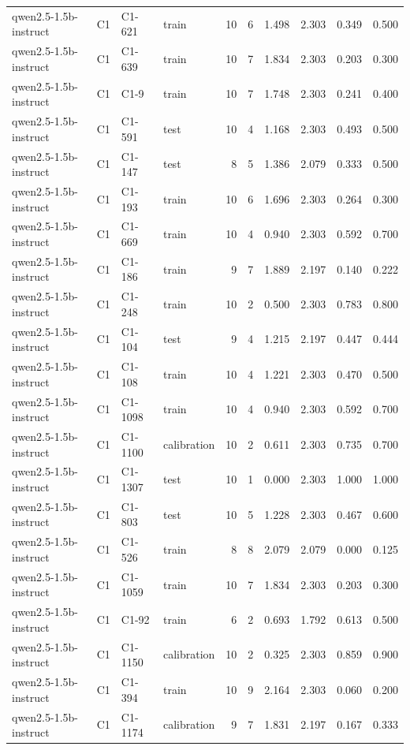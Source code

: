 \begin{table}
\begin{tabular}{llllrrrrrr}
qwen2.5-1.5b-instruct & C1 & C1-621 & train & 10 & 6 & 1.498 & 2.303 & 0.349 & 0.500 \\
qwen2.5-1.5b-instruct & C1 & C1-639 & train & 10 & 7 & 1.834 & 2.303 & 0.203 & 0.300 \\
qwen2.5-1.5b-instruct & C1 & C1-9 & train & 10 & 7 & 1.748 & 2.303 & 0.241 & 0.400 \\
qwen2.5-1.5b-instruct & C1 & C1-591 & test & 10 & 4 & 1.168 & 2.303 & 0.493 & 0.500 \\
qwen2.5-1.5b-instruct & C1 & C1-147 & test & 8 & 5 & 1.386 & 2.079 & 0.333 & 0.500 \\
qwen2.5-1.5b-instruct & C1 & C1-193 & train & 10 & 6 & 1.696 & 2.303 & 0.264 & 0.300 \\
qwen2.5-1.5b-instruct & C1 & C1-669 & train & 10 & 4 & 0.940 & 2.303 & 0.592 & 0.700 \\
qwen2.5-1.5b-instruct & C1 & C1-186 & train & 9 & 7 & 1.889 & 2.197 & 0.140 & 0.222 \\
qwen2.5-1.5b-instruct & C1 & C1-248 & train & 10 & 2 & 0.500 & 2.303 & 0.783 & 0.800 \\
qwen2.5-1.5b-instruct & C1 & C1-104 & test & 9 & 4 & 1.215 & 2.197 & 0.447 & 0.444 \\
qwen2.5-1.5b-instruct & C1 & C1-108 & train & 10 & 4 & 1.221 & 2.303 & 0.470 & 0.500 \\
qwen2.5-1.5b-instruct & C1 & C1-1098 & train & 10 & 4 & 0.940 & 2.303 & 0.592 & 0.700 \\
qwen2.5-1.5b-instruct & C1 & C1-1100 & calibration & 10 & 2 & 0.611 & 2.303 & 0.735 & 0.700 \\
qwen2.5-1.5b-instruct & C1 & C1-1307 & test & 10 & 1 & 0.000 & 2.303 & 1.000 & 1.000 \\
qwen2.5-1.5b-instruct & C1 & C1-803 & test & 10 & 5 & 1.228 & 2.303 & 0.467 & 0.600 \\
qwen2.5-1.5b-instruct & C1 & C1-526 & train & 8 & 8 & 2.079 & 2.079 & 0.000 & 0.125 \\
qwen2.5-1.5b-instruct & C1 & C1-1059 & train & 10 & 7 & 1.834 & 2.303 & 0.203 & 0.300 \\
qwen2.5-1.5b-instruct & C1 & C1-92 & train & 6 & 2 & 0.693 & 1.792 & 0.613 & 0.500 \\
qwen2.5-1.5b-instruct & C1 & C1-1150 & calibration & 10 & 2 & 0.325 & 2.303 & 0.859 & 0.900 \\
qwen2.5-1.5b-instruct & C1 & C1-394 & train & 10 & 9 & 2.164 & 2.303 & 0.060 & 0.200 \\
qwen2.5-1.5b-instruct & C1 & C1-1174 & calibration & 9 & 7 & 1.831 & 2.197 & 0.167 & 0.333 \\

\end{tabular}
\end{table}
